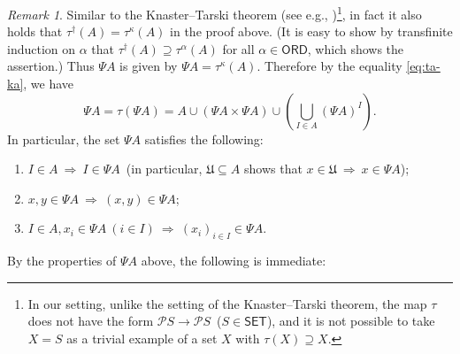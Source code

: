 \documentclass{surv-l}
\numberwithin{equation}{chapter}
\numberwithin{figure}{chapter}
\theoremstyle{plain}
\theoremstyle{definition}
\theoremstyle{remark}
\newtheorem{rmk}[thm]{Remark}
\begin{document}
\begin{rmk}\label{rmk:Psi-property}
Similar to the Knaster--Tarski theorem (see e.g., \cite[Theorem 1.12]{HKT})\footnote{In our setting, unlike the setting of the Knaster--Tarski theorem,
the map $\tau$ does not have the form $\mathcal{P} S \to \mathcal{P} S$\ ($S \in \mathsf{SET}$),
and it is not possible to take $X = S$ as a trivial example of a set $X$ with
$\tau(X) \supseteq X$.},
in fact it also holds that $\tau^\dagger(A) = \tau^\kappa(A)$ in the proof above.
(It is easy to show by transfinite induction on $\alpha$ that $\tau^\dagger(A) \supseteq \tau^\alpha(A)$
for all $\alpha \in \mathsf{ORD}$, which shows the assertion.)
Thus $\Psi A$ is given by $\Psi A = \tau^\kappa(A)$.
Therefore by the equality \eqref{eq:ta-ka}, we have
\begin{equation}\label{eq:Ps-property}
\Psi A = \tau(\Psi A) = A \cup (\Psi A \times \Psi A) \cup \left(\bigcup_{I \in A} (\Psi A)^I\right).
\end{equation}
In particular, the set $\Psi A$ satisfies the following:
\begin{enumerate}
\item
$I \in A \ \text{$\Rightarrow$}\  I \in \Psi A$\  (in particular, $\mathfrak{U} \subseteq A$ shows that $x \in \mathfrak{U} \ \text{$\Rightarrow$}\  x \in \Psi A$);
\item
$x, y \in \Psi A \ \text{$\Rightarrow$}\  (x, y) \in \Psi A$;
\item
$I \in A, x_i \in \Psi A \ (i \in I) \ \text{$\Rightarrow$}\  (x_i)_{i \in I} \in \Psi A$.
\end{enumerate}
\end{rmk}

By the properties of $\Psi A$ above, the following is immediate:
\end{document}
